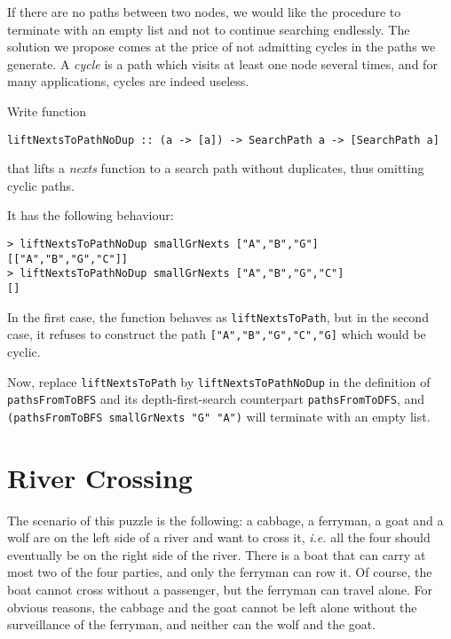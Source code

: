\documentclass[english]{article}
\begin{document}
If there are no paths between two nodes, we would like the procedure to
terminate with an empty list and not to continue searching endlessly. 
The solution we propose comes at the price of not admitting cycles in the
paths we generate. A \emph{cycle} is a path which visits at least one node
several times, and for many applications, cycles are indeed useless.


\begin{exo}\label{exo:liftNextsToPathNoDup}
Write function
\begin{lstlisting}
liftNextsToPathNoDup :: (a -> [a]) -> SearchPath a -> [SearchPath a]
\end{lstlisting}
that lifts a \emph{nexts} function to a search path without duplicates, thus omitting cyclic paths.
\end{exo}

It has the following behaviour:
\begin{lstlisting}
> liftNextsToPathNoDup smallGrNexts ["A","B","G"]
[["A","B","G","C"]]
> liftNextsToPathNoDup smallGrNexts ["A","B","G","C"]
[]
\end{lstlisting}
In the first case, the function behaves as \texttt{liftNextsToPath}, but in
the second case, it refuses to construct the path
\texttt{["A","B","G","C","G]} which would be cyclic.

Now, replace  \texttt{liftNextsToPath} by  \texttt{liftNextsToPathNoDup} in
the definition of \texttt{pathsFromToBFS} and its depth-first-search
counterpart \texttt{pathsFromToDFS}, and \texttt{(pathsFromToBFS smallGrNexts
  "G" "A")} will terminate with an empty list.

\section{River Crossing}\label{sec:river_crossing}

The scenario of this puzzle is the following: a cabbage, a ferryman, a goat
and a wolf are on the left side of a river and want to cross it, \emph{i.e.}
all the four should eventually be on the right side of the river. There is a
boat that can carry at most two of the four parties, and only the ferryman can
row it. Of course, the boat cannot cross without a passenger, but the ferryman
can travel alone. For obvious reasons, the cabbage and the goat cannot be left
alone without the surveillance of the ferryman, and neither can the wolf and
the goat.
\end{document}
